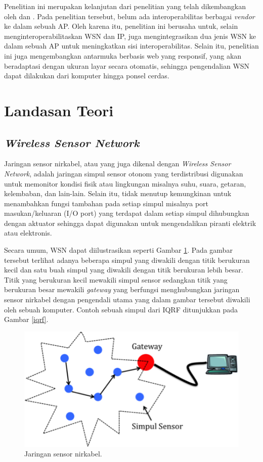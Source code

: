   Penelitian ini merupakan kelanjutan dari penelitian yang telah dikembangkan oleh \cite{wibowo2013wireless} dan \cite{widyawan2012ihome}. Pada penelitian tersebut, belum ada interoperabilitas berbagai \emph{vendor} ke dalam sebuah AP. Oleh karena itu, penelitian ini berusaha untuk, selain menginteroperabilitaskan WSN dan IP, juga mengintegrasikan dua jenis WSN ke dalam sebuah AP untuk meningkatkan sisi interoperabilitas. Selain itu, penelitian ini juga mengembangkan antarmuka berbasis web yang responsif, yang akan beradaptasi dengan ukuran layar secara otomatis, sehingga pengendalian WSN dapat dilakukan dari komputer hingga ponsel cerdas.

\section{Landasan Teori}
  \subsection{\emph{Wireless Sensor Network}}
    Jaringan sensor nirkabel, atau yang juga dikenal dengan \emph{Wireless Sensor Network}, adalah jaringan simpul sensor otonom yang terdistribusi digunakan untuk memonitor kondisi fisik atau lingkungan \cite{Erratt2013} misalnya suhu, suara, getaran, kelembaban, dan lain-lain. Selain itu, tidak menutup kemungkinan untuk menambahkan fungsi tambahan pada setiap simpul misalnya port masukan/keluaran (I/O port) yang terdapat dalam setiap simpul dihubungkan dengan aktuator sehingga dapat digunakan untuk mengendalikan piranti elektrik atau elektronis.

    Secara umum, WSN dapat diilustrasikan seperti Gambar \ref{wsn}. Pada gambar tersebut terlihat adanya beberapa simpul yang diwakili dengan titik berukuran kecil dan satu buah simpul yang diwakili dengan titik berukuran lebih besar. Titik yang berukuran kecil mewakili simpul sensor sedangkan titik yang berukuran besar mewakili \emph{gateway} yang berfungsi menghubungkan jaringan sensor nirkabel dengan pengendali utama yang dalam gambar tersebut diwakili oleh sebuah komputer. Contoh sebuah simpul dari IQRF ditunjukkan pada Gambar \ref{iqrf}.

      \begin{figure}[H]
        \centering
          \includegraphics{gambar/wsn}
          \caption{Jaringan sensor nirkabel.}
          \label{wsn}
      \end{figure}

